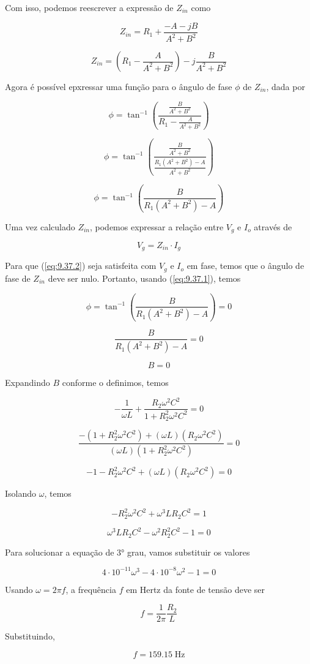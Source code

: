 Com isso, podemos reescrever a expressão de \( Z_{in} \) como

\[ Z_{in} = R_1 + \frac{- A - jB}{A^2 + B^2}  \]

\[ Z_{in} = \left(R_1 - \frac{A}{A^2 + B^2}\right) - j\frac{B}{A^2 + B^2}  \]

Agora é possível epxressar uma função para o ângulo de fase \( \phi \) de \( Z_{in} \), dada por

\[ \phi = \tan^{-1}\left(\frac{\frac{B}{A^2 + B^2}}{R_1 - \frac{A}{A^2 + B^2}}\right) \]

\[ \phi = \tan^{-1}\left(\frac{\frac{B}{A^2 + B^2}}{\frac{R_1(A^2 + B^2) - A}{A^2 + B^2}}\right) \]

\begin{equation}\label{eq:9.37.1}
    \phi = \tan^{-1}\left(\frac{B}{R_1(A^2 + B^2) - A}\right)
\end{equation}

Uma vez calculado $Z_{in}$, podemos expressar a relação entre $V_g$ e $I_o$ através de

\begin{equation}\label{eq:9.37.2}
    V_g = Z_{in} \cdot I_g
\end{equation}

Para que (\ref{eq:9.37.2}) seja satisfeita com $V_g$ e $I_o$ em fase, temos que o ângulo de fase de $Z_{in}$ deve ser nulo. Portanto, usando (\ref{eq:9.37.1}), temos

\[ \phi = \tan^{-1}\left(\frac{B}{R_1(A^2 + B^2) - A}\right) = 0 \]

\[ \frac{B}{R_1(A^2 + B^2) - A} = 0 \]

\[ B = 0 \]

Expandindo $B$ conforme o definimos, temos

\[ -\frac{1}{\omega L} + \frac{R_2\omega^2 C^2}{1 + R_2^2\omega^2 C^2} = 0 \]

\[ \frac{-(1 + R_2^2\omega^2 C^2) + (\omega L)(R_2\omega^2 C^2)}{(\omega L)(1 + R_2^2\omega^2 C^2)} = 0 \]

\[ -1 - R_2^2\omega^2 C^2 + (\omega L)(R_2\omega^2 C^2) = 0 \]

Isolando $\omega$, temos

\[ - R_2^2\omega^2 C^2 + \omega^3LR_2C^2 = 1 \]

\[ \omega^3LR_2C^2 - \omega^2R_2^2C^2 - 1 = 0\]

Para solucionar a equação de 3° grau, vamos substituir os valores

\[ 4\cdot10^{-11}\omega^3 - 4\cdot10^{-8}\omega^2 - 1 = 0\]


Usando $\omega = 2\pi f$, a frequência $f$ em Hertz da fonte de tensão deve ser

\begin{equation}\label{eq:9.37.3}
    f = \frac{1}{2\pi}\frac{R_2}{L}
\end{equation}

Substituindo,

\[ \boxed{f = 159.15 \; \textrm{Hz}}  \]









